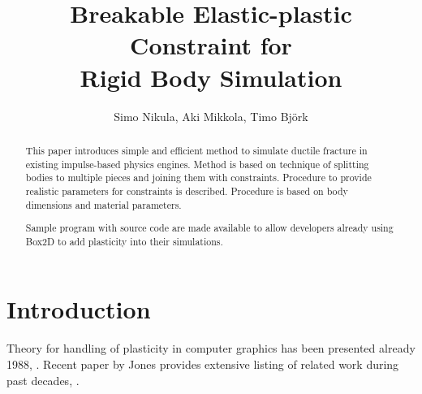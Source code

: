 \documentclass{jcgt}
\begin{document}
\title{Breakable Elastic-plastic Constraint for\\Rigid Body Simulation}

\author
       {Simo Nikula,  Aki Mikkola, Timo Björk\\\lut
       }


\maketitle
\thispagestyle{firstpagestyle}

\begin{abstract}
\small
This paper introduces simple and efficient method to simulate ductile fracture in existing 
impulse-based physics engines.
Method is based on technique of splitting bodies to multiple pieces and joining them with constraints.
Procedure to provide realistic parameters for constraints is described.
Procedure is based on body dimensions and material parameters.

Sample program with source code are made available to allow developers already using 
Box2D to add plasticity into their simulations.
\end{abstract}



\section{Introduction}
\label{sec:introduction}

Theory for handling of plasticity in computer graphics has been presented already 1988, \cite{cg1988}. 
Recent paper by Jones  provides extensive listing of related work during past decades, \cite{Jones:2016:EPD}.
\end{document}
